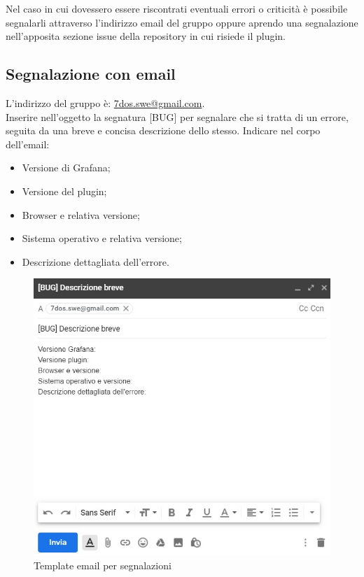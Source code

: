 \pagebreak
{}
Nel caso in cui dovessero essere riscontrati eventuali errori o criticità è possibile segnalarli attraverso l'indirizzo email del gruppo oppure aprendo una segnalazione nell'apposita sezione issue della repository in cui risiede il plugin.

\subsection{Segnalazione con email}
L'indirizzo del gruppo è: {\url{7dos.swe@gmail.com}}. \\
Inserire nell'oggetto la segnatura [BUG] per segnalare che si tratta di un errore, seguita da una breve e concisa descrizione dello stesso.
Indicare nel corpo dell'email:
\begin{itemize}
	\item Versione di Grafana;
	\item Versione del plugin;
	\item Browser e relativa versione;
	\item Sistema operativo e relativa versione;
	\item Descrizione dettagliata dell'errore.
\end{itemize}

\begin{figure} [H]
	\centering
	\includegraphics[scale=0.9]{Img/email.jpg} 
	\caption{Template email per segnalazioni} \label{} 
\end{figure} 

